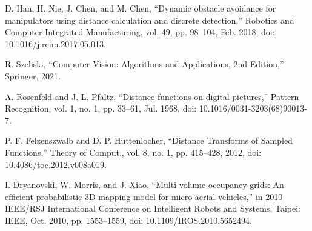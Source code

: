 \documentclass[letterpaper, 10 pt, conference]{ieeeconf}  %
\begin{document}
\begin{thebibliography}{99}
 D. Han, H. Nie, J. Chen, and M. Chen, “Dynamic obstacle avoidance for manipulators using distance calculation and discrete detection,” Robotics and Computer-Integrated Manufacturing, vol. 49, pp. 98–104, Feb. 2018, doi: 10.1016/j.rcim.2017.05.013.



 R. Szeliski, “Computer Vision: Algorithms and Applications, 2nd Edition,” Springer, 2021.

 A. Rosenfeld and J. L. Pfaltz, “Distance functions on digital pictures,” Pattern Recognition, vol. 1, no. 1, pp. 33–61, Jul. 1968, doi: 10.1016/0031-3203(68)90013-7.

 P. F. Felzenszwalb and D. P. Huttenlocher, “Distance Transforms of Sampled Functions,” Theory of Comput., vol. 8, no. 1, pp. 415–428, 2012, doi: 10.4086/toc.2012.v008a019.



 I. Dryanovski, W. Morris, and J. Xiao, “Multi-volume occupancy grids: An efficient probabilistic 3D mapping model for micro aerial vehicles,” in 2010 IEEE/RSJ International Conference on Intelligent Robots and Systems, Taipei: IEEE, Oct. 2010, pp. 1553–1559, doi: 10.1109/IROS.2010.5652494.



\end{thebibliography}
\end{document}
